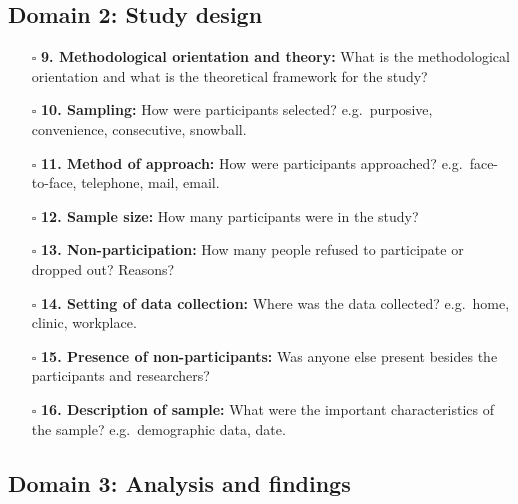 \documentclass[11pt]{article}
\def\tightlist{}
\begin{document}
\begin{Form}
\subsection{Domain 2: Study design}\label{domain-2-study-design}

\begin{itemize}
\tightlist
\item[$\square$]
  \textbf{9. Methodological orientation and theory:} What is the
  methodological orientation and what is the theoretical framework for
  the study?
\item[$\square$]
  \textbf{10. Sampling:} How were participants selected? e.g.~purposive,
  convenience, consecutive, snowball.
\item[$\square$]
  \textbf{11. Method of approach:} How were participants approached?
  e.g.~face-to-face, telephone, mail, email.
\item[$\square$]
  \textbf{12. Sample size:} How many participants were in the study?
\item[$\square$]
  \textbf{13. Non-participation:} How many people refused to participate
  or dropped out? Reasons?
\item[$\square$]
  \textbf{14. Setting of data collection:} Where was the data collected?
  e.g.~home, clinic, workplace.
\item[$\square$]
  \textbf{15. Presence of non-participants:} Was anyone else present
  besides the participants and researchers?
\item[$\square$]
  \textbf{16. Description of sample:} What were the important
  characteristics of the sample? e.g.~demographic data, date.
\end{itemize}

\subsection{Domain 3: Analysis and
findings}\label{domain-3-analysis-and-findings}


\end{Form}
\end{document}
